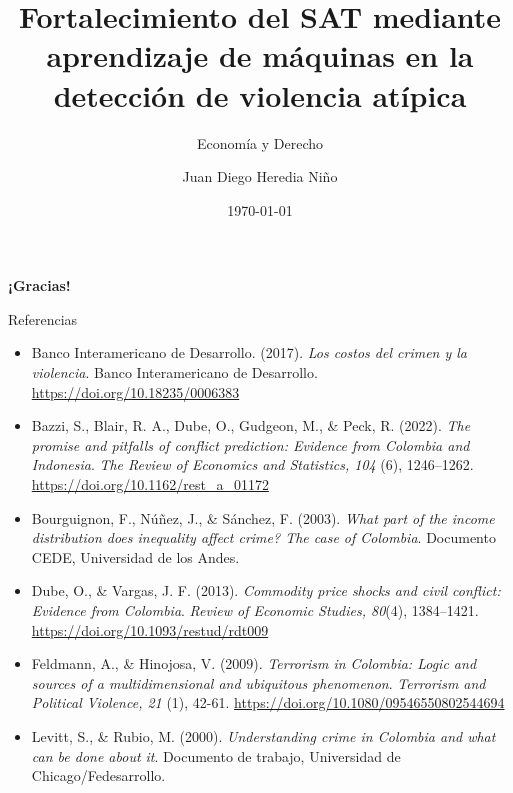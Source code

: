 \documentclass[aspectratio=169,xcolor=dvipsnames, t]{beamer}
\title[Pronóstico de Violencia Extrema]{Fortalecimiento del SAT mediante aprendizaje de máquinas en la detección de violencia atípica}
\subtitle{Economía y Derecho}
\author[Heredia Niño]{Juan Diego Heredia Niño}
\institute[Universidad de los Andes]{Facultad de Economía \newline Universidad de los Andes}
\date{\today}
\begin{document}
\maketitlepage










\begin{frame}{}
    \vspace{3.5cm}
    \centering
    \LARGE \alert{\textbf{¡Gracias!}} 

\end{frame}

\begin{frame}{Referencias}

\begin{itemize}
\tiny
    \item Banco Interamericano de Desarrollo. (2017). \textit{Los costos del crimen y la violencia}. Banco Interamericano de Desarrollo. \url{https://doi.org/10.18235/0006383}

    \item Bazzi, S., Blair, R. A., Dube, O., Gudgeon, M., \& Peck, R. (2022). \textit{The promise and pitfalls of conflict prediction: Evidence from Colombia and Indonesia}. \textit{The Review of Economics and Statistics, 104} (6), 1246–1262. \url{https://doi.org/10.1162/rest_a_01172}
    
    \item Bourguignon, F., Núñez, J., \& Sánchez, F. (2003). \textit{What part of the income distribution does inequality affect crime? The case of Colombia}. Documento CEDE, Universidad de los Andes.

    \item Dube, O., \& Vargas, J. F. (2013). \textit{Commodity price shocks and civil conflict: Evidence from Colombia}. \textit{Review of Economic Studies, 80}(4), 1384–1421. \url{https://doi.org/10.1093/restud/rdt009}

    \item Feldmann, A., \& Hinojosa, V. (2009). \textit{Terrorism in Colombia: Logic and sources of a multidimensional and ubiquitous phenomenon}. \textit{Terrorism and Political Violence, 21} (1), 42-61. \url{https://doi.org/10.1080/09546550802544694}

    \item Levitt, S., \& Rubio, M. (2000). \textit{Understanding crime in Colombia and what can be done about it}. Documento de trabajo, Universidad de Chicago/Fedesarrollo.


\end{itemize}
\end{frame}
\end{document}
